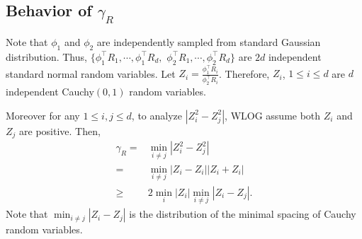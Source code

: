 \documentclass[twoside]{article}
\newcommand{\Ephione}{\mathcal{E}_{\phi_1}}
\theoremstyle{definition}
\begin{document}
\subsection{Behavior of $\gamma_R$}
\label{subsec:gammaR}
Note that $\phi_1$ and $\phi_2$ are independently sampled from standard Gaussian distribution. 
Thus, $\{\phi_1^{\top}R_1, \cdots, \phi_1^{\top}R_d,$ $\phi_2^{\top}R_1, \cdots, \phi_2^{\top}R_d\}$ are $2d$ independent standard normal random variables. 
Let $Z_i = \frac{\phi_1^{\top}R_i}{\phi_2^{\top}R_i}$. Therefore, $Z_i$, $1\le i\le d$ are $d$ independent Cauchy$(0,1)$ random variables. 

Moreover for any $1\le i, j \le d$, to analyze $\left\vert Z_i^2 - Z_j^2\right\vert
$, WLOG assume both $Z_i$ and $Z_j$ are positive. Then, 
\begin{align*}
\gamma_R =	& \min_{i\neq j} \left\vert Z_i^2 - Z_j^2 \right\vert \\
	=		& \min_{i\neq j}\left\vert Z_i - Z_i \right\vert	\left\vert Z_i + Z_i \right\vert \\
	\ge 	& 2\min_i\vert Z_i\vert\min_{i\neq j} \left\vert Z_i - Z_j \right\vert.
\end{align*}
Note that $\min_{i\neq j} \left\vert Z_i - Z_j \right\vert$ is the distribution of the minimal spacing of Cauchy random variables.
\end{document}
